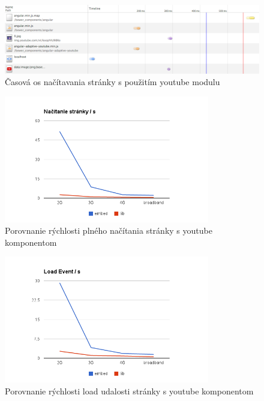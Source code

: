 \begin{figure}[H]
  \centering
  \includegraphics[width=1.0\textwidth]{img/load/timeline-y-a.png}
  \caption[Časová os načítavania stránky s použitím youtube modulu]{
    Časová os načítavania stránky s použitím youtube modulu}
  \label{fig: timeline-y-a}
\end{figure}

\begin{figure}[H]
  \centering
  \includegraphics[width=0.8\textwidth]{img/load/youtube-fullload.png}
  \caption[Porovnanie rýchlosti plného načítania stránky s youtube komponentom]{
    Porovnanie rýchlosti plného načítania stránky s youtube komponentom}
  \label{fig: youtube-fullload}
\end{figure}

\begin{figure}[H]
  \centering
  \includegraphics[width=0.8\textwidth]{img/load/youtube-load.png}
  \caption[Porovnanie rýchlosti load udalosti stránky s youtube komponentom]{
    Porovnanie rýchlosti load udalosti stránky s youtube komponentom}
  \label{fig: youtube-load}
\end{figure}

